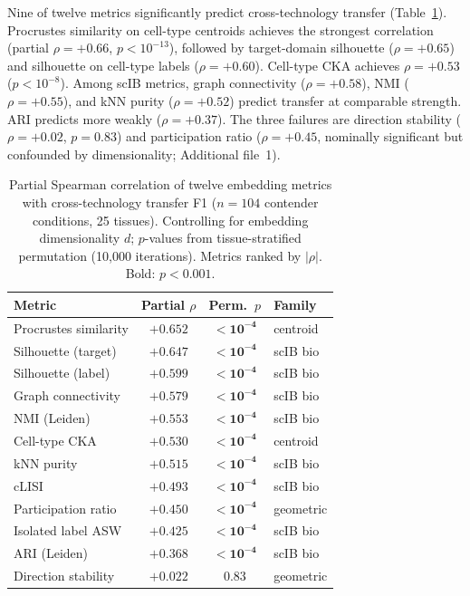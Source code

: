 \documentclass[11pt]{article}
\begin{document}
Nine of twelve metrics significantly predict cross-technology transfer
(Table~\ref{tab:metrics}). Procrustes similarity on cell-type centroids
achieves the strongest correlation (partial $\rho = +0.66$,
$p < 10^{-13}$), followed by target-domain silhouette ($\rho = +0.65$)
and silhouette on cell-type labels ($\rho = +0.60$). Cell-type CKA
achieves $\rho = +0.53$ ($p < 10^{-8}$). Among scIB metrics, graph
connectivity ($\rho = +0.58$), NMI ($\rho = +0.55$), and kNN purity
($\rho = +0.52$) predict transfer at comparable strength. ARI predicts
more weakly ($\rho = +0.37$). The three failures are
direction stability ($\rho = +0.02$, $p = 0.83$) and
participation ratio ($\rho = +0.45$, nominally significant but
confounded by dimensionality; Additional file~1).

\medskip
\begin{table}[t]
\centering
\caption{Partial Spearman correlation of twelve embedding metrics with
cross-technology transfer F1 ($n = 104$ contender conditions, 25
tissues). Controlling for embedding dimensionality $d$; $p$-values from
tissue-stratified permutation (10,000 iterations). Metrics ranked by
$|\rho|$. Bold: $p < 0.001$.}
\label{tab:metrics}
\small
\begin{tabular}{@{}lccl@{}}
\toprule
Metric & Partial $\rho$ & Perm.\ $p$ & Family \\
\midrule
Procrustes similarity   & $+0.652$ & $\mathbf{< 10^{-4}}$ & centroid \\
Silhouette (target)     & $+0.647$ & $\mathbf{< 10^{-4}}$ & scIB bio \\
Silhouette (label)      & $+0.599$ & $\mathbf{< 10^{-4}}$ & scIB bio \\
Graph connectivity      & $+0.579$ & $\mathbf{< 10^{-4}}$ & scIB bio \\
NMI (Leiden)            & $+0.553$ & $\mathbf{< 10^{-4}}$ & scIB bio \\
Cell-type CKA           & $+0.530$ & $\mathbf{< 10^{-4}}$ & centroid \\
kNN purity              & $+0.515$ & $\mathbf{< 10^{-4}}$ & scIB bio \\
cLISI                   & $+0.493$ & $\mathbf{< 10^{-4}}$ & scIB bio \\
Participation ratio     & $+0.450$ & $\mathbf{< 10^{-4}}$ & geometric \\
Isolated label ASW      & $+0.425$ & $\mathbf{< 10^{-4}}$ & scIB bio \\
ARI (Leiden)            & $+0.368$ & $\mathbf{< 10^{-4}}$ & scIB bio \\
Direction stability     & $+0.022$ & $0.83$               & geometric \\
\bottomrule
\end{tabular}
\end{table}
\end{document}
